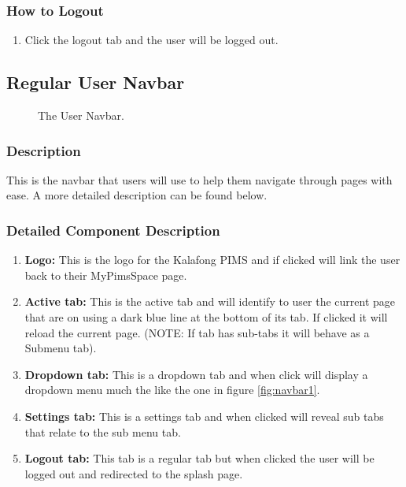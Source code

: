 \documentclass[14pt, a4paper]{article}
\begin{document}
	\subsubsection{How to Logout}
		\begin{enumerate}
			\item Click the logout tab and the user will be logged out.
		\end{enumerate}
\subsection {Regular User Navbar}
	\begin{figure}[H]
		\caption{The User Navbar.}
		\label{fig:navbar4}
	\end{figure}
	\subsubsection{Description} This is the navbar that users will use to help them navigate through pages with ease. A more detailed description can be found below.
	\subsubsection{Detailed Component Description}
		\begin{enumerate}
			\item \textbf{Logo:} This is the logo for the Kalafong PIMS and if clicked will link the user back to their MyPimsSpace page.
			\item \textbf{Active tab:} This is the active tab and will identify to user the current page that are on using a dark blue line at the bottom of its tab. If clicked it will reload the current page. (NOTE: If tab has sub-tabs it will behave as a Submenu tab).
			\item \textbf{Dropdown tab: } This is a dropdown tab and when click will display a dropdown menu much the like the one in figure \ref{fig:navbar1}.
			\item \textbf{Settings tab:} This is a settings tab and when clicked will reveal sub tabs that relate to the sub menu tab.
			\item \textbf{Logout tab:} This tab is a regular tab but when clicked the user will be logged out and redirected to the splash page.
		\end{enumerate}
\end{document}
